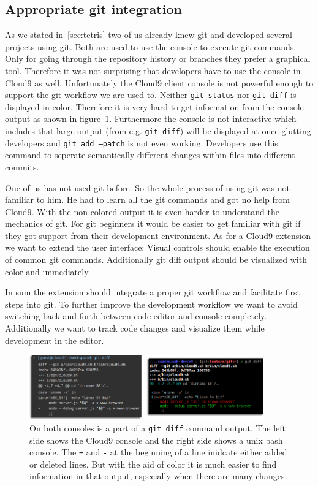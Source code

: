 \subsection{Appropriate git integration}
\label{subsec:ext_git_integration}
As we stated in~\ref{sec:tetris} two of us already knew git and developed several projects using git.
Both are used to use the console to execute git commands. Only for going through the repository history or branches they prefer a graphical tool.
Therefore it was not surprising that developers have to use the console in Cloud9 as well.
Unfortunately the Cloud9 client console is not powerful enough to support the git workflow we are used to.
Neither \texttt{git status} nor \texttt{git diff} is displayed in color.
Therefore it is very hard to get information from the console output as shown in figure~\ref{fig:diff_output}.
Furthermore the console is not interactive which includes that large output (from e.g. \texttt{git diff}) will be displayed at once glutting developers and \texttt{git add --patch} is not even working.
Developers use this command to seperate semantically different changes within files into different commits.

One of us has not used git before.
So the whole process of using git was not familiar to him.
He had to learn all the git commands and got no help from Cloud9.
With the non-colored output it is even harder to understand the mechanics of git.
For git beginners it would be easier to get familiar with git if they got support from their development environment.
As for a Cloud9 extension we want to extend the user interface: 
Visual controls should enable the execution of common git commands.
Additionally git diff output should be visualized with color and immediately.

In sum the extension should integrate a proper git workflow and facilitate first steps into git.
To further improve the development workflow we want to avoid switching back and forth between code editor and console completely.
Additionally we want to track code changes and visualize them while development in the editor.

\begin{figure}
   \centering
   \includegraphics[width=0.9\textwidth]{images/diff_output.png}
   \caption{On both consoles is a part of a \texttt{git diff} command output.
   The left side shows the Cloud9 console and the right side shows a unix bash console.
   The \texttt{+} and \texttt{-} at the beginning of a line inidcate either added or deleted lines.
   But with the aid of color it is much easier to find information in that output, especially when there are many changes.}
   \label{fig:diff_output}
\end{figure}


